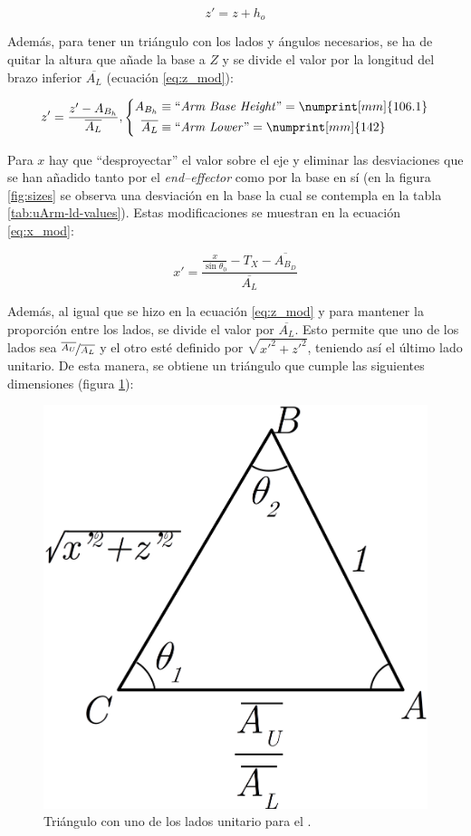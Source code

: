 \begin{equation}
    z' = z + h_o
\end{equation}

Además, para tener un triángulo con los lados y ángulos necesarios, se ha de quitar la
altura que añade la base a $Z$ y se divide el valor por la longitud del brazo inferior
$\overline{A_L}$ (ecuación \ref{eq:z_mod}):

\begin{equation}\label{eq:z_mod}
    z' = \frac{z' - A_{B_h}}{\overline{A_L}},
    \left\{\begin{aligned}
        A_{B_h}        & \equiv \text{``\textit{Arm Base Height}''} = \numprint[mm]{106.1} \\
        \overline{A_L} & \equiv \text{``\textit{Arm Lower}''} = \numprint[mm]{142}
    \end{aligned}\right.
\end{equation}

Para $x$ hay que ``desproyectar'' el valor sobre el eje y eliminar las desviaciones
que se han añadido tanto por el \textit{end--effector} como por la base en sí (en la
figura \ref{fig:sizes} se observa una desviación en la base la cual se contempla
en la tabla \ref{tab:uArm-ld-values}). Estas modificaciones se muestran en la ecuación
\ref{eq:x_mod}:

\begin{equation}\label{eq:x_mod}
    x' = \frac{\frac{x}{\sin{\theta_0}} - T_X - \overline{A_{B_D}}}{\overline{A_L}}
\end{equation}

Además, al igual que se hizo en la ecuación \ref{eq:z_mod} y para mantener la proporción
entre los lados, se divide el valor por $\overline{A_L}$. Esto permite que uno de los
lados sea $\nicefrac{\overline{A_U}}{\overline{A_L}}$ y el otro esté definido por
$\sqrt{x'^2 + z'^2}$, teniendo así el último lado unitario.
De esta manera, se obtiene un triángulo que cumple las siguientes dimensiones
(figura \ref{fig:unitary_triangle}):

\begin{figure}[H]
    \centering
    \includegraphics[width=.3\linewidth]{pictures/ik_unitary_triangle.png}
    \caption{Triángulo con uno de los lados unitario para el \pArm{}.}
    \label{fig:unitary_triangle}
\end{figure}

